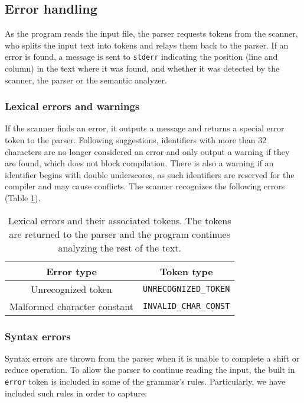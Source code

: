 \subsection{Error handling}
As the program reads the input file, the parser requests tokens from the scanner, who splits the
input text into tokens and relays them back to the parser. If an error is found, a message is
sent to \texttt{stderr} indicating the position (line and column) in the text where it was found,
and whether it was detected by the scanner, the parser or the semantic analyzer.


\subsubsection{Lexical errors and warnings}
If the scanner finds an error, it outputs a message and returns a special error token to the parser.
Following suggestions, identifiers with more than 32 characters are no longer considered an error
and only output a warning if they are found, which does not block compilation. There is also a warning
if an identifier begins with double underscores, as such identifiers are reserved for the compiler
and may cause conflicts. The scanner recognizes the following errors (Table \ref{tab:scanner-errors}).

\begin{table}[h]
\centering
\captionsetup{width=0.7\textwidth}
\caption{Lexical errors and their associated tokens. The tokens are returned
to the parser and the program continues analyzing the rest of the text.}
\label{tab:scanner-errors}
\begin{tabular} {c c}
\hline
Error type & Token type \\
\hline
Unrecognized token & \texttt{UNRECOGNIZED\_TOKEN} \\
Malformed character constant & \texttt{INVALID\_CHAR\_CONST} \\
\hline
\end{tabular}
\end{table}

\subsubsection{Syntax errors}
Syntax errors are thrown from the parser when it is unable to complete a shift or reduce
operation. To allow the parser to continue reading the input, the built in \texttt{error}
token is included in some of the grammar's rules. Particularly, we have included
such rules in order to capture: 

